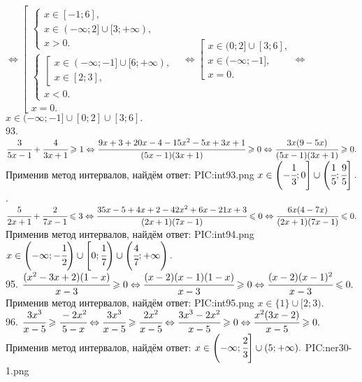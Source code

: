 $\Leftrightarrow\left[\begin{array}{l} \begin{cases} x\in[-1;6],\\ x\in(-\infty;2]\cup[3;+\infty),\\ x>0.\end{cases}\\
\begin{cases} \left[\begin{array}{l}x\in(-\infty;-1]\cup[6;+\infty),\\ x\in[2;3],\end{array}\right.\\ x<0.\end{cases}\\x=0.\end{array}\right.
\Leftrightarrow\left[\begin{array}{l} x\in(0;2]\cup[3;6],\\
x\in(-\infty;-1],\\x=0.\end{array}\right.\Leftrightarrow $\\$x \in (-\infty;-1]\cup[0;2]\cup[3;6].$\\
93. $\cfrac{3}{5x-1}+\cfrac{4}{3x+1}\geqslant1\Leftrightarrow\cfrac{9x+3+20x-4-15x^2-5x+3x+1}{(5x-1)(3x+1)}\geqslant 0\Leftrightarrow
\cfrac{3x(9-5x)}{(5x-1)(3x+1)}\geqslant 0.$ Применив метод интервалов, найдём ответ:
{{PIC:int93.png}}
$x\in\left(-\cfrac{1}{3};0\right]\cup\left(\cfrac{1}{5};\cfrac{9}{5}\right].$\newpage{}. $\cfrac{5}{2x+1}+\cfrac{2}{7x-1}\leqslant3\Leftrightarrow\cfrac{35x-5+4x+2-42x^2+6x-21x+3}{(2x+1)(7x-1)}\leqslant 0\Leftrightarrow
\cfrac{6x(4-7x)}{(2x+1)(7x-1)}\leqslant 0.$ Применив метод интервалов, найдём ответ:
{{PIC:int94.png}}
$x\in\left(-\infty;-\cfrac{1}{2}\right)\cup\left[0;\cfrac{1}{7}\right)\cup\left(\cfrac{4}{7};+\infty\right).$\\
95. $\cfrac{(x^2-3x+2)(1-x)}{x-3}\geqslant0\Leftrightarrow\cfrac{(x-2)(x-1)(1-x)}{x-3}\geqslant0\Leftrightarrow\cfrac{(x-2)(x-1)^2}{x-3}\leqslant0.$ Применив метод интервалов, найдём ответ:
{{PIC:int95.png}}
$x\in\{1\}\cup[2;3).$\\
96. $\cfrac{3x^3}{x-5}\geqslant\cfrac{-2x^2}{5-x}\Leftrightarrow\cfrac{3x^3}{x-5}\geqslant\cfrac{2x^2}{x-5}\Leftrightarrow
\cfrac{3x^3-2x^2}{x-5}\geqslant0\Leftrightarrow\cfrac{x^2(3x-2)}{x-5}\geqslant0.$ Применив метод интервалов, найдём ответ: $x\in\left(-\infty;\cfrac{2}{3}\right]
\cup(5;+\infty).$
{{PIC:ner30-1.png}}\\

